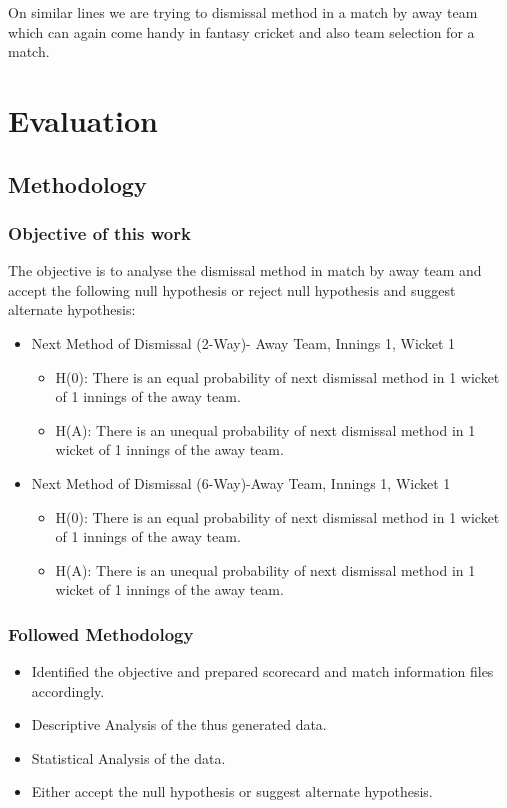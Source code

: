 \documentclass[fleqn,10pt]{wlscirep}
\begin{document}
On similar lines we are trying to dismissal method in a match by away team which can again come handy in fantasy cricket and also team selection for a match.

\section{Evaluation}
\subsection{Methodology}
\subsubsection{Objective of this work}
The objective is to analyse the dismissal method in match by away team and accept the following null hypothesis or reject null hypothesis and suggest alternate hypothesis:
\begin{itemize}
\item Next Method of Dismissal (2-Way)- Away Team, Innings 1, Wicket 1
\begin{itemize}
\item H(0): There is an equal probability of next dismissal method in 1 wicket of 1 innings of the away team.
\item H(A): There is an unequal probability of next dismissal method in 1 wicket of 1 innings of the away team.
\end{itemize}
\item Next Method of Dismissal (6-Way)-Away Team, Innings 1, Wicket 1
\begin{itemize}
\item H(0): There is an equal probability of next dismissal method in 1 wicket of 1 innings of the away team.
\item H(A): There is an unequal probability of next dismissal method in 1 wicket of 1 innings of the away team.
\end{itemize}
\end{itemize}
\subsubsection{Followed Methodology}
\begin{itemize}
    \item Identified the objective and prepared scorecard and match information files accordingly.
    \item Descriptive Analysis of the thus generated data.
    \item Statistical Analysis of the data.
    \item Either accept the null hypothesis or suggest alternate hypothesis.
\end{itemize}
\end{document}
